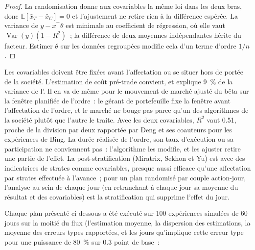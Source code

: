 \begin{proof}
La randomisation donne aux covariables la même loi dans les deux bras, donc $\mathbb{E}[\bar x_T - \bar x_C] = 0$ et l'ajustement ne retire rien à la
différence espérée. La variance de $y - x^\top\theta$ est minimale au coefficient de régression, où elle vaut $\operatorname{Var}(y)(1 - R^2)$~; la
différence de deux moyennes indépendantes hérite du facteur. Estimer $\theta$ sur les données regroupées modifie cela d'un terme d'ordre $1/n$.
\end{proof}

Les covariables doivent être fixées avant l'affectation ou se situer hors de portée de la société. L'estimation de coût pré-trade convient, et explique 9~\% de la variance de
l'. Il en va de même pour le mouvement de marché ajusté du bêta sur la fenêtre planifiée de l'ordre~: le gérant de portefeuille fixe la fenêtre avant
l'affectation de l'ordre, et le marché ne bouge pas parce qu'un des algorithmes de la société plutôt que l'autre le traite. Avec les deux covariables, $R^2$ vaut 0.51, proche
de la division par deux rapportée par Deng et ses coauteurs pour les expériences de Bing. La durée réalisée de l'ordre, son taux d'exécution ou sa participation ne conviennent pas~:
l'algorithme les modifie, et les ajuster retire une partie de l'effet. La post-stratification (Miratrix, Sekhon et Yu) est  avec des indicatrices de strates comme
covariables, presque aussi efficace qu'une affectation par strates effectuée à l'avance~; pour un plan randomisé par couple action-jour, l'analyse au sein de chaque jour (en retranchant à chaque jour
sa moyenne du résultat et des covariables) est la stratification qui supprime l'effet du jour.

Chaque plan présenté ci-dessous a été exécuté sur 100 expériences simulées de 60 jours sur la moitié du flux (l'estimation moyenne, la dispersion des estimations, la moyenne
des erreurs types rapportées, et les jours qu'implique cette erreur type pour une puissance de 80~\% sur 0.3 point de base~:

